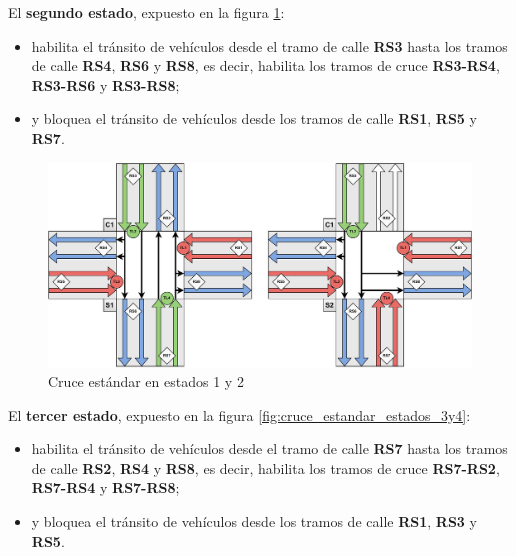El \textbf{segundo estado}, expuesto en la figura \ref{fig:cruce_estandar_estados_1y2}:
\begin{itemize}
    \item habilita el tránsito de vehículos desde el tramo de calle \textbf{RS3} hasta los tramos de calle \textbf{RS4}, \textbf{RS6} y \textbf{RS8}, es decir, habilita los tramos de cruce \textbf{RS3-RS4}, \textbf{RS3-RS6} y \textbf{RS3-RS8};
    \item y bloquea el tránsito de vehículos desde los tramos de calle \textbf{RS1}, \textbf{RS5} y \textbf{RS7}.
\end{itemize}
\begin{figure}[H]
    \centering
    \includegraphics[width=1\linewidth]{text/image/DCruc-CE-Estados1y2.pdf}
    \caption{Cruce estándar en estados 1 y 2}
    \label{fig:cruce_estandar_estados_1y2}
\end{figure}

\newpage
El \textbf{tercer estado}, expuesto en la figura \ref{fig:cruce_estandar_estados_3y4}:
\begin{itemize}
    \item habilita el tránsito de vehículos desde el tramo de calle \textbf{RS7} hasta los tramos de calle \textbf{RS2}, \textbf{RS4} y \textbf{RS8}, es decir, habilita los tramos de cruce \textbf{RS7-RS2}, \textbf{RS7-RS4} y \textbf{RS7-RS8};
    \item y bloquea el tránsito de vehículos desde los tramos de calle \textbf{RS1}, \textbf{RS3} y \textbf{RS5}.
\end{itemize}

